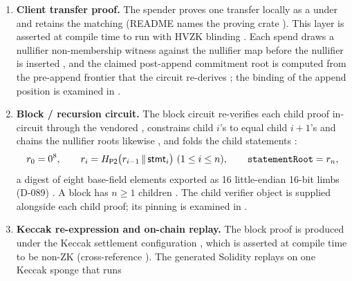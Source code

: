 \begin{enumerate}
\item \textbf{Client transfer proof.} The spender proves one transfer locally
  as a  under 
  and retains the matching 
  (README names the proving crate  ).
  This layer is asserted at compile time to run with HVZK blinding
  . Each spend draws a nullifier
  non-membership witness against the nullifier map before the nullifier is
  inserted , and the claimed
  post-append commitment root is computed from the pre-append frontier that
  the circuit re-derives ;
  the binding of the append position is examined in .
\item \textbf{Block / recursion circuit.} The block circuit re-verifies each
  child proof in-circuit through the vendored 
  ,
  constrains child $i$'s  to equal child $i{+}1$'s
   and chains the nullifier roots likewise
  , and folds the child statements
  :
  \begin{equation}
    r_0 = 0^{8},\qquad r_i = H_{\mathsf{P2}}\bigl(r_{i-1} \,\|\, \mathsf{stmt}_i\bigr)\ (1 \le i \le n),\qquad
    \texttt{statementRoot} = r_n,
    \label{eq:ov-fold}
  \end{equation}
  a digest of eight base-field elements exported as 16 little-endian 16-bit
  limbs (D-089) . A block has
  $n \ge 1$ children . The child
  verifier object is supplied alongside each child proof; its pinning is
  examined in .
\item \textbf{Keccak re-expression and on-chain replay.} The block proof is
  produced under the Keccak settlement configuration
  , which is asserted at
  compile time to be non-ZK 
  (cross-reference ). The generated Solidity 
  replays  on one Keccak sponge that runs

\end{enumerate}
